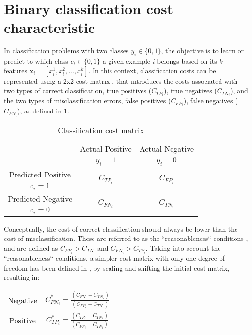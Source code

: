 {\section{Binary classification cost characteristic}
\label{sec:3:cost_characteristic}

  In classification problems with two classes $y_i \in \{0,1\}$, the objective is to learn or 
  predict to which class $c_i \in \{0,1\}$ a given example $i$ belongs based on its $k$ features 
  $\mathbf{x}_i=[x^1_i, x^2_i,...,x^k_i]$. In this context, classification costs can be 
  represented using a 2x2 cost matrix \citep{Elkan2001}, that introduces the costs 
  associated with   two types of correct   classification, true positives ($C_{TP_i}$), true 
  negatives ($C_{TN_i}$),   and the two  types of   misclassification errors, false positives 
  ($C_{FP_i}$), false negatives   ($C_{FN_i}$), as   defined in \tablename{ 
  \ref{tab:3:cost_matrix}}.

  
  \begin{table}[t]
    \centering
    \footnotesize
    \begin{tabular}{c|c|c}
      \multicolumn{1}{c|}{}  & Actual Positive& Actual Negative \\
      \multicolumn{1}{c|}{} & $y_i=1$& $y_i=0$ \\
      \hline
      Predicted Positive    & \multirow{ 2}{*}{$C_{TP_i}$} & \multirow{ 2}{*}{$C_{FP_i}$} \\
      $c_i=1$ & &\\
      \hline
      Predicted Negative    & \multirow{ 2}{*}{$C_{FN_i}$} & \multirow{ 2}{*}{$C_{TN_i}$} \\
      $c_i=0$ & &\\
    \end{tabular}
    \caption{Classification cost matrix}
    \label{tab:3:cost_matrix}
  \end{table}  

  Conceptually, the cost of correct classification should always be lower than the cost of 
  misclassification. These are referred to as the ``reasonableness`` conditions \citep{Elkan2001}, 
  and are defined as  $C_{FP_i} > C_{TN_i}$ and $C_{FN_i} > C_{TP_i}$.
  Taking into account the ``reasonableness`` conditions, a simpler cost matrix 
  with only one degree of freedom has been defined in \citep{Elkan2001},
  by scaling and shifting the initial cost matrix, resulting in:
  \begin{center}
    \footnotesize
    \begin{tabular}{c|c}
    \multirow{ 2}{*}{Negative} & \multirow{ 
    2}{*}{$C^*_{FN_i}=\frac{(C_{FN_i}-C_{TN_i})}{(C_{FP_i}-C_{TN_i})}$} \\
    \\
    \hline
    \multirow{ 2}{*}{Positive} & \multirow{ 
    2}{*}{$C^*_{TP_i}=\frac{(C_{TP_i}-C_{TN_i})}{(C_{FP_i}-C_{TN_i})}$} \\
    \\ 
    \end{tabular}
  \end{center}

}
